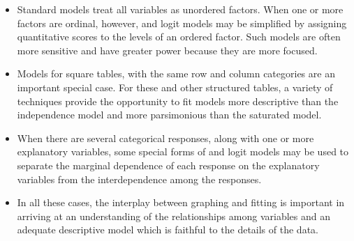 \begin{itemize}

\item Standard \loglin models treat all variables as unordered factors.
When one or more factors are ordinal, however, \loglin and logit models
may be simplified by assigning quantitative scores to the levels of
an ordered factor.
Such models are often more sensitive and have greater power because they
are more focused.

\item Models for square tables, with the same row and column categories
are an important special case. For these and other structured tables,
a variety of techniques provide the opportunity to fit models more
descriptive than the independence model and more parsimonious than
the saturated model.


\item When there are several categorical responses, along with one or
more explanatory variables, some special forms of \loglin and logit
models may be used to separate the marginal dependence of each response
on the explanatory variables from the interdependence among the responses.

\item In all these cases, the interplay between graphing and fitting is important in 
arriving at an understanding of the relationships among variables and
an adequate descriptive model which is faithful to the details of the
data.


\end{itemize}

